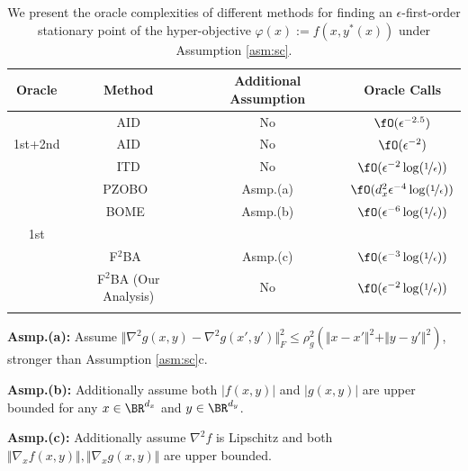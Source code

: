 \documentclass{article}
\begin{document}
\begin{table}[t]
    \centering
    \caption{
    We present the oracle complexities of different methods for finding an $\epsilon$-first-order stationary point of the hyper-objective $\varphi(x):= f(x,y^*(x))$ under Assumption \ref{asm:sc}.}
    \label{tab:res-1st}
    \begin{tabular}{c c c c}
    \hline 
    Oracle     & Method  & 
    Additional Assumption  & Oracle Calls    \\
    \hline \hline 
    \addlinespace
         & AID \citep{ghadimi2018approximation} & No & $\fO( \epsilon^{-2.5} )$ 
    \\
     \addlinespace
    1st+2nd & AID \citep{ji2021bilevel} & No & $\fO ( \epsilon^{-2}   )$  \\
    \addlinespace
    & ITD \citep{ji2021bilevel} & No & $ \fO ( \epsilon^{-2} \log(\nicefrac{1}{\epsilon}))$  \\
    \addlinespace
    \hline
    \addlinespace
    & PZOBO~\citep{sow2022convergence}  & Asmp.(a) & $\fO( d_{x}^2\epsilon^{-4} \log (\nicefrac{1}{\epsilon}))$
    \\
    \addlinespace
    & BOME~\citep{liu2022bome} &  Asmp.(b)  &$ \fO(  \epsilon^{-6} \log(\nicefrac{1}{\epsilon}))$   \\[-0.12cm]
    1st \\[-0.12cm]
    & F${}^2$BA~\citep{kwon2023fully} &  Asmp.(c) &$  \fO(  \epsilon^{-3} \log(\nicefrac{1}{\epsilon}))$  \\
    \addlinespace
     & 
F${}^2$BA (Our Analysis)
      & No & $  \fO( \epsilon^{-2} \log(\nicefrac{1}{\epsilon}))$  \\ 
     \addlinespace
     \hline
    \end{tabular}
    \begin{tablenotes}
		{\scriptsize   
  \item \textbf{Asmp.(a):} Assume $ \Vert \nabla^2 g(x,y) - \nabla^2 g(x',y') \Vert_F^2 \le \rho_g^2 (\Vert x-x' \Vert^2 +  \Vert y - y' \Vert^2)$, stronger than Assumption \ref{asm:sc}c. 
  \item \textbf{Asmp.(b):} Additionally assume both $\vert f(x,y) \vert $ and $ \vert g(x,y) \vert$ are upper bounded for any $x \in \BR^{d_x}$ and $y \in \BR^{d_y}$.
  \item \textbf{Asmp.(c):} Additionally assume $\nabla^2 f$ is Lipschitz and both $\Vert \nabla_x f(x,y)\Vert, \Vert \nabla_x g(x,y) \Vert $ are upper bounded.
   }
    \end{tablenotes}
\end{table}
\end{document}
